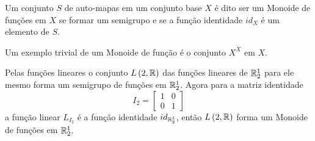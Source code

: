 \begin{definition}
  Um conjunto $S$ de auto-mapas em um conjunto base $X$ é dito ser um Monoide de funções em $X$ se formar um semigrupo e se a função identidade $id_{X}$ é um elemento de $S$.
\end{definition}
Um exemplo trivial de um Monoide de função é o conjunto $X^X$ em $X$.
\begin{exmp}
Pelas funções lineares o conjunto $L\left(2,\mathbb{R}\right)$ das funções lineares de $\mathbb{R}_{2}^{1}$ para ele mesmo forma um semigrupo de funções em $\mathbb{R}_{2}^{1}$. Agora para a matriz identidade
$$I_{2} = \begin{bmatrix}
    1 & 0\\
    0 & 1
  \end{bmatrix}
$$
a função linear $L_{I_{2}}$ é a função identidade $id_{\mathbb{R}_{2}^{1}}$, então $L\left(2,\mathbb{R}\right)$ forma um Monoide de funções em $\mathbb{R}_{2}^{1}.$
\end{exmp}

